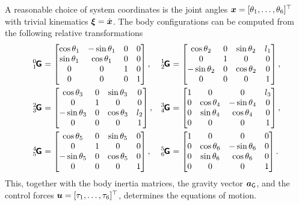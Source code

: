 A reasonable choice of system coordinates is the joint angles $\sysCoord = [\jointAngle[1], \ldots, \jointAngle[6]]^\top$ with trivial kinematics $\sysVel = \sysCoordd$.
The body configurations can be computed from the following relative transformations
\begin{align}
 \bodyHomoCoord{0}{1}{}{} &=
 \begin{bmatrix}
  \cos\jointAngle[1] & -\sin\jointAngle[1] & 0 & 0 \\
  \sin\jointAngle[1] &  \cos\jointAngle[1] & 0 & 0 \\
  0 & 0 & 1 & 0 \\
  0 & 0 & 0 & 1
 \end{bmatrix},&
 \bodyHomoCoord{1}{2}{}{} &=
 \begin{bmatrix}
  \cos\jointAngle[2] & 0 & \sin\jointAngle[2] & l_1 \\
  0 & 1 & 0 & 0 \\
  -\sin\jointAngle[2] & 0 & \cos\jointAngle[2] & 0 \\
  0 & 0 & 0 & 1
 \end{bmatrix},
\nonumber\\
 \bodyHomoCoord{2}{3}{}{} &=
 \begin{bmatrix}
  \cos\jointAngle[3] & 0 & \sin\jointAngle[3] & 0 \\
  0 & 1 & 0 & 0 \\
  -\sin\jointAngle[3] & 0 & \cos\jointAngle[3] & l_2 \\
  0 & 0 & 0 & 1
 \end{bmatrix},&
 \bodyHomoCoord{3}{4}{}{} &=
 \begin{bmatrix}
  1 & 0 & 0 & l_3 \\
  0 & \cos\jointAngle[4] & -\sin\jointAngle[4] & 0 \\
  0 & \sin\jointAngle[4] &  \cos\jointAngle[4] & 0 \\
  0 & 0 & 0 & 1
 \end{bmatrix},
\nonumber\\
 \bodyHomoCoord{4}{5}{}{} &=
 \begin{bmatrix}
  \cos\jointAngle[5] & 0 & \sin\jointAngle[5] & 0 \\
  0 & 1 & 0 & 0 \\
  -\sin\jointAngle[5] & 0 & \cos\jointAngle[5] & 0 \\
  0 & 0 & 0 & 1
 \end{bmatrix},&
 \bodyHomoCoord{5}{6}{}{} &=
 \begin{bmatrix}
  1 & 0 & 0 & 0 \\
  0 & \cos\jointAngle[6] & -\sin\jointAngle[6] & 0 \\
  0 & \sin\jointAngle[6] &  \cos\jointAngle[6] & 0 \\
  0 & 0 & 0 & 1
 \end{bmatrix}
 .
\end{align}
This, together with the body inertia matrices, the gravity vector $\gravityAcc$, and the control forces $\sysInput = [\tau_1, \ldots, \tau_6]^\top$, determines the equations of motion.

